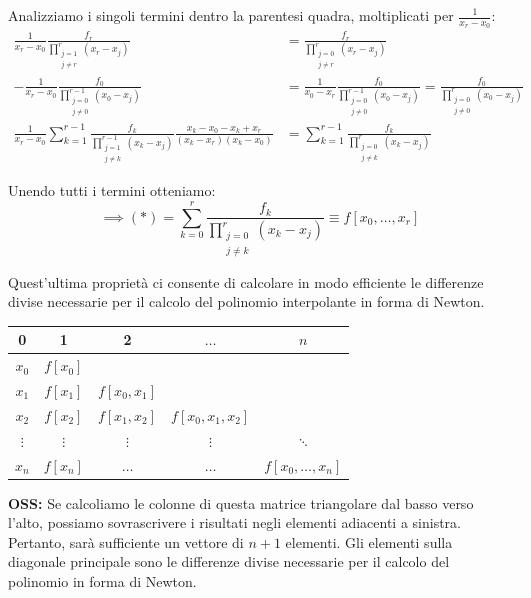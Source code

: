 Analizziamo i singoli termini dentro la parentesi quadra, moltiplicati per $\frac{1}{x_r-x_0}$:
\begin{align*}
    \frac{1}{x_r-x_0} \frac{f_r}{\prod_{\substack{j=1 \\ j \neq r}}^{r}(x_r-x_j)} &= \frac{f_r}{\prod_{\substack{j=0 \\ j \neq r}}^{r}(x_r-x_j)} \\
    -\frac{1}{x_r-x_0} \frac{f_0}{\prod_{\substack{j=0 \\ j \neq 0}}^{r-1}(x_0-x_j)} &= \frac{1}{x_0-x_r} \frac{f_0}{\prod_{\substack{j=0 \\ j \neq 0}}^{r-1}(x_0-x_j)} = \frac{f_0}{\prod_{\substack{j=0 \\ j \neq 0}}^{r}(x_0-x_j)} \\
    \frac{1}{x_r-x_0} \sum_{k=1}^{r-1} \frac{f_k}{\prod_{\substack{j=1 \\ j \neq k}}^{r-1}(x_k-x_j)} \frac{x_k-x_0 - x_k + x_r}{(x_k-x_r)(x_k-x_0)} &= \sum_{k=1}^{r-1} \frac{f_k}{\prod_{\substack{j=0 \\ j \neq k}}^{r}(x_k-x_j)}
\end{align*}

Unendo tutti i termini otteniamo:
$$\implies (*) = \sum_{k=0}^{r} \frac{f_k}{\prod_{\substack{j=0 \\ j \neq k}}^{r}(x_k-x_j)} \equiv f[x_0, \dots, x_r]$$

Quest'ultima proprietà ci consente di calcolare in modo efficiente le differenze divise necessarie per il calcolo del polinomio interpolante in forma di Newton.

\begin{center}
\renewcommand{\arraystretch}{1.5}
\begin{tabular}{ccccc}
0 & 1 & 2 & $\dots$ & $n$ \\
\hline
$x_0$ & $f[x_0]$ & & & \\
$x_1$ & $f[x_1]$ & $f[x_0, x_1]$ & & \\
$x_2$ & $f[x_2]$ & $f[x_1, x_2]$ & $f[x_0, x_1, x_2]$ & \\
$\vdots$ & $\vdots$ & $\vdots$ & $\vdots$ & $\ddots$ \\
$x_n$ & $f[x_n]$ & $\dots$ & $\dots$ & $f[x_0, \dots, x_n]$ \\
\end{tabular}
\end{center}

\textbf{OSS:} Se calcoliamo le colonne di questa matrice triangolare dal basso verso l'alto, possiamo sovrascrivere i risultati negli elementi adiacenti a sinistra. Pertanto, sarà sufficiente un vettore di $n+1$ elementi. 
Gli elementi sulla diagonale principale sono le differenze divise necessarie per il calcolo del polinomio in forma di Newton.





